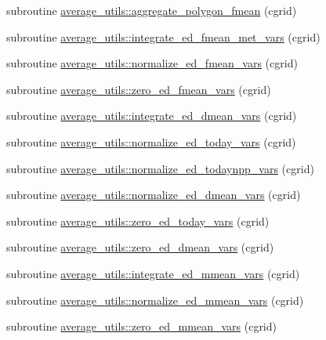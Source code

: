 \begin{DoxyCompactItemize}
\item 
subroutine \hyperlink{namespaceaverage__utils_a90965230835c19a82d90127089235c76}{average\+\_\+utils\+::aggregate\+\_\+polygon\+\_\+fmean} (cgrid)
\item 
subroutine \hyperlink{namespaceaverage__utils_acf7868319b9242daa7eea553b25f2899}{average\+\_\+utils\+::integrate\+\_\+ed\+\_\+fmean\+\_\+met\+\_\+vars} (cgrid)
\item 
subroutine \hyperlink{namespaceaverage__utils_a662a31926be61beb22be003b5ec40343}{average\+\_\+utils\+::normalize\+\_\+ed\+\_\+fmean\+\_\+vars} (cgrid)
\item 
subroutine \hyperlink{namespaceaverage__utils_a40f7a4a46972fb6b9c0fe90fdc73a173}{average\+\_\+utils\+::zero\+\_\+ed\+\_\+fmean\+\_\+vars} (cgrid)
\item 
subroutine \hyperlink{namespaceaverage__utils_a985b401d85dd857f44371dd2c3e7c40c}{average\+\_\+utils\+::integrate\+\_\+ed\+\_\+dmean\+\_\+vars} (cgrid)
\item 
subroutine \hyperlink{namespaceaverage__utils_a538e2e59c7c2889ae624b6e1d2a9e5f2}{average\+\_\+utils\+::normalize\+\_\+ed\+\_\+today\+\_\+vars} (cgrid)
\item 
subroutine \hyperlink{namespaceaverage__utils_a446f9090fbbcf3eb12f4b9231d946e89}{average\+\_\+utils\+::normalize\+\_\+ed\+\_\+todaynpp\+\_\+vars} (cgrid)
\item 
subroutine \hyperlink{namespaceaverage__utils_a2203ebc403bfd01a55cf7aac61777819}{average\+\_\+utils\+::normalize\+\_\+ed\+\_\+dmean\+\_\+vars} (cgrid)
\item 
subroutine \hyperlink{namespaceaverage__utils_a6a92d00bf7112b127a596bd765cc12c6}{average\+\_\+utils\+::zero\+\_\+ed\+\_\+today\+\_\+vars} (cgrid)
\item 
subroutine \hyperlink{namespaceaverage__utils_af1a2224da3c590c5645db8efa5c16c9f}{average\+\_\+utils\+::zero\+\_\+ed\+\_\+dmean\+\_\+vars} (cgrid)
\item 
subroutine \hyperlink{namespaceaverage__utils_a24f0cd542ec9741c1bcc76e640498cd2}{average\+\_\+utils\+::integrate\+\_\+ed\+\_\+mmean\+\_\+vars} (cgrid)
\item 
subroutine \hyperlink{namespaceaverage__utils_afce18c59b2e9d5605d22e4d356934bdb}{average\+\_\+utils\+::normalize\+\_\+ed\+\_\+mmean\+\_\+vars} (cgrid)
\item 
subroutine \hyperlink{namespaceaverage__utils_aa5221fd3b377dfe424dbdcb81b83c378}{average\+\_\+utils\+::zero\+\_\+ed\+\_\+mmean\+\_\+vars} (cgrid)

\end{DoxyCompactItemize}
